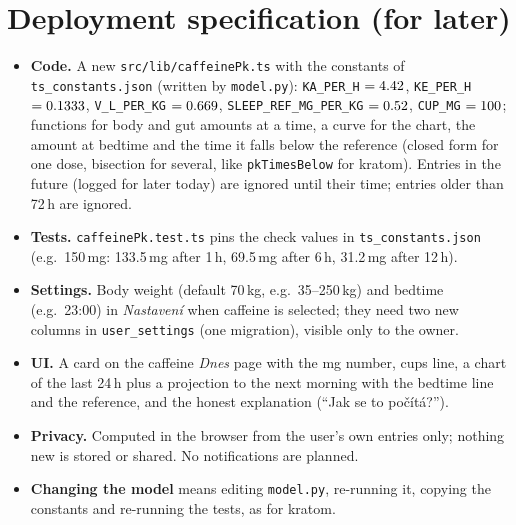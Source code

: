 \documentclass[10pt,a4paper]{article}
\begin{document}
\section{Deployment specification (for later)}
\label{sec:deploy}
\begin{itemize}
\item \textbf{Code.} A new \texttt{src/lib/caffeinePk.ts} with the constants of
\texttt{ts\_constants.json} (written by \texttt{model.py}): \texttt{KA\_PER\_H} $=4.42$,
\texttt{KE\_PER\_H} $=0.1333$, \texttt{V\_L\_PER\_KG} $=0.669$, \texttt{SLEEP\_REF\_MG\_PER\_KG} $=0.52$,
\texttt{CUP\_MG} $=100$; functions for body and gut amounts at a time, a curve for the chart, the amount
at bedtime and the time it falls below the reference (closed form for one dose, bisection for several,
like \texttt{pkTimesBelow} for kratom). Entries in the future (logged for later today) are ignored until
their time; entries older than 72\,h are ignored.
\item \textbf{Tests.} \texttt{caffeinePk.test.ts} pins the check values in \texttt{ts\_constants.json}
(e.g.\ 150\,mg: 133.5\,mg after 1\,h, 69.5\,mg after 6\,h, 31.2\,mg after 12\,h).
\item \textbf{Settings.} Body weight (default 70\,kg, e.g.\ 35--250\,kg) and bedtime (e.g.\ 23:00) in
\emph{Nastavení} when caffeine is selected; they need two new columns in \texttt{user\_settings} (one
migration), visible only to the owner.
\item \textbf{UI.} A card on the caffeine \emph{Dnes} page with the mg number, cups line, a chart of the last
24\,h plus a projection to the next morning with the bedtime line and the reference, and the honest
explanation (``Jak se to počítá?'').
\item \textbf{Privacy.} Computed in the browser from the user's own entries only; nothing new is stored or
shared. No notifications are planned.
\item \textbf{Changing the model} means editing \texttt{model.py}, re-running it, copying the constants
and re-running the tests, as for kratom.
\end{itemize}
\end{document}
